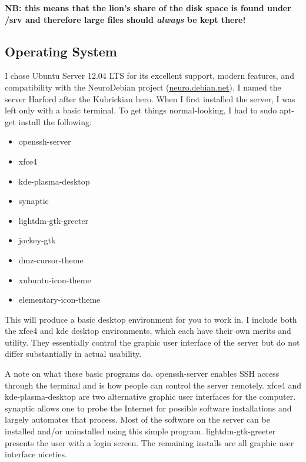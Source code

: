 \documentclass[final,titlepage,letterpaper,oneside,12pt]{article}
\renewcommand{\texttt}[2][BrickRed]{\textcolor{#1}{\ttfamily #2}}%
\begin{document}
\begin{center}
\textbf{NB: this means that the lion's share of the disk space is found under \texttt{/srv} and therefore large files should \textit{always} be kept there!}
\end{center}

\subsection{Operating System}

I chose Ubuntu Server 12.04 LTS for its excellent support, modern features, and compatibility with the NeuroDebian project (\url{neuro.debian.net}). I named the server Harford after the Kubrickian hero. When I first installed the server, I was left only with a basic terminal. To get things normal-looking, I had to \texttt{sudo apt-get install} the following:

\noindent
\begin{small}
\begin{itemize} \itemsep-2pt
    \item{openssh-server}
    \item{xfce4}
    \item{kde-plasma-desktop}
    \item{synaptic}
    \item{lightdm-gtk-greeter}
    \item{jockey-gtk}
    \item{dmz-cursor-theme} 
    \item{xubuntu-icon-theme}
    \item{elementary-icon-theme}
\end{itemize}
\end{small}


This will produce a basic desktop environment for you to work in. I include both the \texttt{xfce4} and \texttt{kde} desktop environments, which each have their own merits and utility. They essentially control the graphic user interface of the server but do not differ substantially in actual usability.

A note on what these basic programs do. \texttt{openssh-server} enables SSH access through the terminal and is how people can control the server remotely. \texttt{xfce4} and \texttt{kde-plasma-desktop} are two alternative graphic user interfaces for the computer. \texttt{synaptic} allows one to probe the Internet for possible software installations and largely automates that process. Most of the software on the server can be installed and/or uninstalled using this simple program. \texttt{lightdm-gtk-greeter} presents the user with a login screen. The remaining installs are all graphic user interface niceties.
\end{document}
